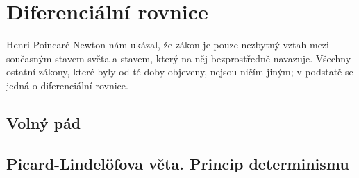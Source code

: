 \chapter{Diferenciální rovnice} \label{ch:Diferenciani rovnice}
\begin{chapquote}{Henri Poincaré}%
Newton nám ukázal, že zákon je pouze nezbytný vztah mezi současným stavem světa a stavem, který na něj bezprostředně navazuje. Všechny ostatní zákony, které byly od té doby objeveny, nejsou ničím jiným; v podstatě se jedná o diferenciální rovnice.
\end{chapquote}

\section{Volný pád}

\section{Picard-Lindelöfova věta. Princip determinismu}
